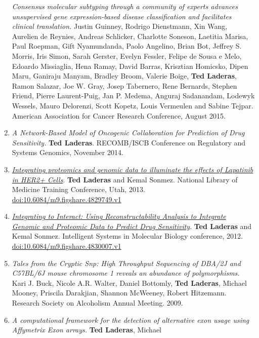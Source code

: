 \documentclass[11pt,]{article}
\begin{document}
\begin{enumerate}
  \emph{Consensus molecular subtyping through a community of experts
  advances unsupervised gene expression-based disease classification and
  facilitates clinical translation.} Justin Guinney, Rodrigo Dienstmann,
  Xin Wang, Aurelien de Reynies, Andreas Schlicker, Charlotte Soneson,
  Laetitia Marisa, Paul Roepman, Gift Nyamundanda, Paolo Angelino, Brian
  Bot, Jeffrey S. Morris, Iris Simon, Sarah Gerster, Evelyn Fessler,
  Felipe de Sousa e Melo, Edoardo Missiaglia, Hena Ramay, David Barras,
  Krisztian Homicsko, Dipen Maru, Ganiraju Manyam, Bradley Broom,
  Valerie Boige, \textbf{Ted Laderas}, Ramon Salazar, Joe W. Gray, Josep
  Tabernero, Rene Bernards, Stephen Friend, Pierre Laurent-Puig, Jan P.
  Medema, Anguraj Sadanandam, Lodewyk Wessels, Mauro Delorenzi, Scott
  Kopetz, Louis Vermeulen and Sabine Tejpar. American Association for
  Cancer Research Conference, August 2015.
\item
  \emph{A Network-Based Model of Oncogenic Collaboration for Prediction
  of Drug Sensitivity.} \textbf{Ted Laderas}. RECOMB/ISCB Conference on
  Regulatory and Systems Genomics, November 2014.
\item
  \href{https://www.dropbox.com/s/y3rbkygjn41qsd6/poster-laderas-nlm-2013.pdf?dl=0}{\emph{Integrating
  proteomics and genomic data to illuminate the effects of Lapatinib in
  HER2+ Cells}}. \textbf{Ted Laderas} and Kemal Sonmez. National Library
  of Medicine Training Conference, Utah, 2013.
  \href{https://doi.org/10.6084/m9.figshare.4829749.v1}{doi:10.6084/m9.figshare.4829749.v1}
\item
  \href{https://www.dropbox.com/s/nhixsztlg1oo4z6/poster-laderas-ismb-2012.pdf?dl=0}{\emph{Integrating
  to Interact: Using Reconstructability Analysis to Integrate Genomic
  and Proteomic Data to Predict Drug Sensitivity}}. \textbf{Ted Laderas}
  and Kemal Sonmez. Intelligent Systems in Molecular Biology conference,
  2012.
  \href{https://doi.org/10.6084/m9.figshare.4830007.v1}{doi:10.6084/m9.figshare.4830007.v1}
\item
  \emph{Tales from the Cryptic Snp: High Throughput Sequencing of DBA/2J
  and C57BL/6J mouse chromosome 1 reveals an abundance of
  polymorphisms.} Kari J. Buck, Nicole A.R. Walter, Daniel Bottomly,
  \textbf{Ted Laderas}, Michael Mooney, Priscila Darakjian, Shannon
  McWeeney, Robert Hitzemann. Research Society on Alcoholism Annual
  Meeting. 2009.
\item
  \emph{A computational framework for the detection of alternative exon
  usage using Affymetrix Exon arrays.} \textbf{Ted Laderas}, Michael

\end{enumerate}
\end{document}

